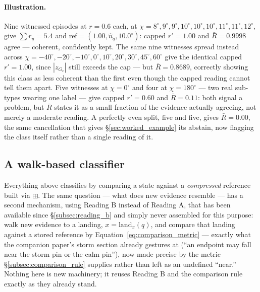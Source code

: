 \documentclass[12pt, a4paper]{article}
\begin{document}
\paragraph{Illustration.}
\label{par:reference_atom_illustration}
Nine witnessed episodes at $r=0.6$ each, at
$\chi=8^\circ,9^\circ,9^\circ,10^\circ,10^\circ,10^\circ,11^\circ,
11^\circ,12^\circ$, give $\sum r_y=5.4$ and
$\mathrm{ref}=(1.00,\hat n_q,10.0^\circ)$: capped $r'=1.00$ and
$\bar R=0.9998$ agree --- coherent, confidently kept. The same nine
witnesses spread instead across
$\chi=-40^\circ,-20^\circ,-10^\circ,0^\circ,10^\circ,20^\circ,
30^\circ,45^\circ,60^\circ$ give the identical capped $r'=1.00$, since
$|z_{G_c}|$ still exceeds the cap --- but $\bar R=0.8689$, correctly
showing this class as less coherent than the first even though the
capped reading cannot tell them apart. Five witnesses at $\chi=0^\circ$
and four at $\chi=180^\circ$ --- two real sub-types wearing one
label --- give capped $r'=0.60$ and $\bar R=0.11$: both signal a
problem, but $\bar R$ states it as a small fraction of the evidence
actually agreeing, not merely a moderate reading. A perfectly even
split, five and five, gives $\bar R=0.00$, the same cancellation that
gives \S\ref{sec:worked_example} its abstain, now flagging the class
itself rather than a single reading of it.

\subsection{A walk-based classifier}
\label{subsec:walk_classifier}

Everything above classifies by comparing a state against a
\emph{compressed} reference built via $\boxplus$. The same question
--- what does new evidence resemble --- has a second mechanism,
using Reading B instead of Reading A, that has been available since
\S\ref{subsec:reading_b} and simply never assembled for this purpose:
walk new evidence to a landing, $x=\mathrm{land}_\pi(q)$, and compare
that landing against a stored reference by
Equation~\eqref{eq:comparison_metric} --- exactly what the companion
paper's storm section already gestures at (``an endpoint may fall
near the storm pin or the calm pin''), now made precise by the metric
\S\ref{subsec:comparison_rule} supplies rather than left as an
undefined ``near.'' Nothing here is new machinery; it reuses Reading
B and the comparison rule exactly as they already stand.
\end{document}
